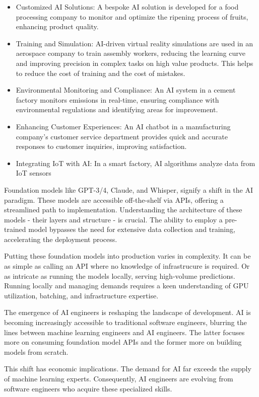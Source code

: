 \documentclass[
  letterpaper,
  DIV=11,
  numbers=noendperiod]{scrartcl}
\begin{document}
\begin{itemize}
\item
  Customized AI Solutions: A bespoke AI solution is developed for a food
  processing company to monitor and optimize the ripening process of
  fruits, enhancing product quality.
\item
  Training and Simulation: AI-driven virtual reality simulations are
  used in an aerospace company to train assembly workers, reducing the
  learning curve and improving precision in complex tasks on high value
  products. This helps to reduce the cost of training and the cost of
  mistakes.
\item
  Environmental Monitoring and Compliance: An AI system in a cement
  factory monitors emissions in real-time, ensuring compliance with
  environmental regulations and identifying areas for improvement.
\item
  Enhancing Customer Experiences: An AI chatbot in a manufacturing
  company's customer service department provides quick and accurate
  responses to customer inquiries, improving satisfaction.
\item
  Integrating IoT with AI: In a smart factory, AI algorithms analyze
  data from IoT sensors
\end{itemize}

Foundation models like GPT-3/4, Claude, and Whisper, signify a shift in
the AI paradigm. These models are accessible off-the-shelf via APIs,
offering a streamlined path to implementation. Understanding the
architecture of these models - their layers and structure - is crucial.
The ability to employ a pre-trained model bypasses the need for
extensive data collection and training, accelerating the deployment
process.

Putting these foundation models into production varies in complexity. It
can be as simple as calling an API where no knowledge of infrastrucure
is required. Or as intricate as running the models locally, serving
high-volume predictions. Running locally and managing demands requires a
keen understanding of GPU utilization, batching, and infrastructure
expertise.

The emergence of AI engineers is reshaping the landscape of development.
AI is becoming increasingly accessible to traditional software
engineers, blurring the lines between machine learning engineers and AI
engineers. The latter focuses more on consuming foundation model APIs
and the former more on building models from scratch.

This shift has economic implications. The demand for AI far exceeds the
supply of machine learning experts. Consequently, AI engineers are
evolving from software engineers who acquire these specialized skills.
\end{document}
